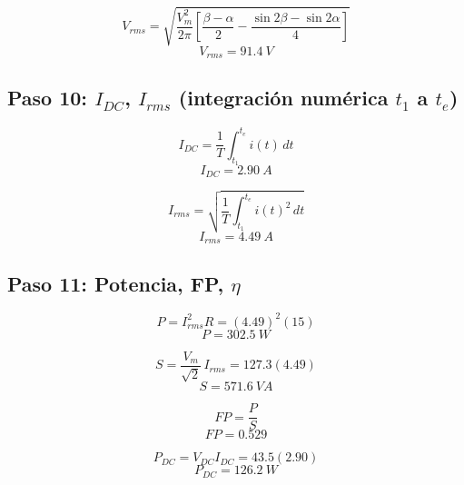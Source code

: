 \documentclass[12pt]{article}
\begin{document}
\begin{equation}
V_{rms}=\sqrt{\frac{V_m^2}{2\pi}\left[\frac{\beta-\alpha}{2}-\frac{\sin2\beta-\sin2\alpha}{4}\right]}
\end{equation}
\begin{equation}
\boxed{V_{rms}=91.4\ V}
\end{equation}

\subsection*{Paso 10: $I_{DC}$, $I_{rms}$ (integración numérica $t_1$ a $t_e$)}
\begin{equation}
I_{DC}=\frac{1}{T}\int_{t_1}^{t_e}i(t)\,dt
\end{equation}
\begin{equation}
\boxed{I_{DC}=2.90\ A}
\end{equation}

\begin{equation}
I_{rms}=\sqrt{\frac{1}{T}\int_{t_1}^{t_e}i(t)^2\,dt}
\end{equation}
\begin{equation}
\boxed{I_{rms}=4.49\ A}
\end{equation}

\subsection*{Paso 11: Potencia, FP, $\eta$}
\begin{equation}
P=I_{rms}^2R=(4.49)^2(15)
\end{equation}
\begin{equation}
\boxed{P=302.5\ W}
\end{equation}

\begin{equation}
S=\frac{V_m}{\sqrt2}\,I_{rms}=127.3(4.49)
\end{equation}
\begin{equation}
\boxed{S=571.6\ VA}
\end{equation}

\begin{equation}
FP=\frac{P}{S}
\end{equation}
\begin{equation}
\boxed{FP=0.529}
\end{equation}

\begin{equation}
P_{DC}=V_{DC}I_{DC}=43.5(2.90)
\end{equation}
\begin{equation}
\boxed{P_{DC}=126.2\ W}
\end{equation}
\end{document}
